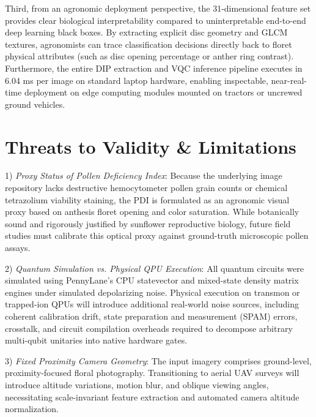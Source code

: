 \documentclass{ieeeaccess}
\begin{document}
Third, from an agronomic deployment perspective, the 31-dimensional feature set provides clear biological interpretability compared to uninterpretable end-to-end deep learning black boxes. By extracting explicit disc geometry and GLCM textures, agronomists can trace classification decisions directly back to floret physical attributes (such as disc opening percentage or anther ring contrast). Furthermore, the entire DIP extraction and VQC inference pipeline executes in 6.04 ms per image on standard laptop hardware, enabling inspectable, near-real-time deployment on edge computing modules mounted on tractors or uncrewed ground vehicles.

\section{Threats to Validity \& Limitations}
\label{sec:threats_to_validity}
1) \textit{Proxy Status of Pollen Deficiency Index}: Because the underlying image repository lacks destructive hemocytometer pollen grain counts or chemical tetrazolium viability staining, the PDI is formulated as an agronomic visual proxy based on anthesis floret opening and color saturation. While botanically sound and rigorously justified by sunflower reproductive biology, future field studies must calibrate this optical proxy against ground-truth microscopic pollen assays.

2) \textit{Quantum Simulation vs. Physical QPU Execution}: All quantum circuits were simulated using PennyLane's CPU statevector and mixed-state density matrix engines under simulated depolarizing noise. Physical execution on transmon or trapped-ion QPUs will introduce additional real-world noise sources, including coherent calibration drift, state preparation and measurement (SPAM) errors, crosstalk, and circuit compilation overheads required to decompose arbitrary multi-qubit unitaries into native hardware gates.

3) \textit{Fixed Proximity Camera Geometry}: The input imagery comprises ground-level, proximity-focused floral photography. Transitioning to aerial UAV surveys will introduce altitude variations, motion blur, and oblique viewing angles, necessitating scale-invariant feature extraction and automated camera altitude normalization.
\end{document}
